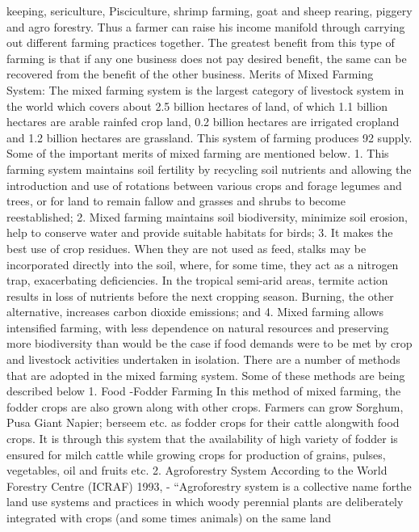 keeping, sericulture, Pisciculture, shrimp farming, goat and sheep
rearing, piggery and agro forestry. Thus a farmer can raise his
income manifold through carrying out different farming practices
together. The greatest benefit from this type of farming is that if
any one business does not pay desired benefit, the same can be
recovered from the benefit of the other business.
Merits of Mixed Farming System:
The mixed farming system is the largest category of livestock
system in the world which covers about 2.5 billion hectares of land,
of which 1.1 billion hectares are arable rainfed crop land, 0.2 billion
hectares are irrigated cropland and 1.2 billion hectares are
grassland. This system of farming produces 92%
supply.
Some of the important merits of mixed farming are mentioned
below.
1. This farming system maintains soil fertility by recycling soil
nutrients and allowing the introduction and use of rotations between
various crops and forage legumes and trees, or for land to remain
fallow and grasses and shrubs to become reestablished;
2. Mixed farming maintains soil biodiversity, minimize soil erosion,
help to conserve water and provide suitable habitats for birds;
3. It makes the best use of crop residues. When they are not used
as feed, stalks may be incorporated directly into the soil, where, for
some time, they act as a nitrogen trap, exacerbating deficiencies. In
the tropical semi-arid areas, termite action results in loss of
nutrients before the next cropping season. Burning, the other
alternative, increases carbon dioxide emissions; and
4. Mixed farming allows intensified farming, with less dependence on
natural resources and preserving more biodiversity than would be
the case if food demands were to be met by crop and livestock
activities undertaken in isolation.
There are a number of methods that are adopted in the mixed
farming system. Some of these methods are being described below
1. Food -Fodder Farming
In this method of mixed farming, the fodder crops are also grown
along with other crops. Farmers can grow Sorghum, Pusa Giant
Napier; berseem etc. as fodder crops for their cattle alongwith food
crops. It is through this system that the availability of high variety
of fodder is ensured for milch cattle while growing crops for
production of grains, pulses, vegetables, oil and fruits etc.
2. Agroforestry System
According to the World Forestry Centre (ICRAF) 1993, -
“Agroforestry system is a collective name forthe land use systems
and practices in which woody perennial plants are deliberately
integrated with crops (and some times animals) on the same land

